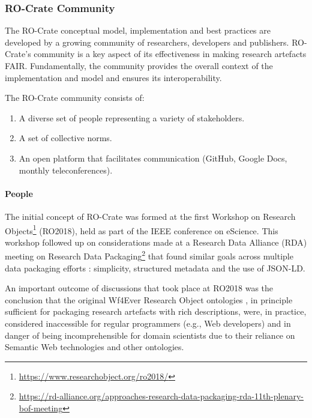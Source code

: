 \subsubsection{RO-Crate Community}\label{ch5:community}

The RO-Crate conceptual model, implementation and best practices are
developed by a growing community of researchers, developers and
publishers. RO-Crate's community is a key aspect of its effectiveness in
making research artefacts FAIR. Fundamentally, the community provides
the overall context of the implementation and model and ensures its
interoperability.

The RO-Crate community consists of:

\begin{enumerate}
\item
  A diverse set of people representing a variety of stakeholders.
\item
  A set of collective norms.
\item
  An open platform that facilitates communication (GitHub, Google Docs,
  monthly teleconferences).
\end{enumerate}

\hypertarget{people}{%
\paragraph{People}\label{ch5:people}}

The initial concept of RO-Crate was formed at the first Workshop on
Research Objects\footnote{\url{https://www.researchobject.org/ro2018/}} (RO2018),
held as part of the IEEE conference on eScience. This workshop followed
up on considerations made at a Research Data Alliance (RDA) meeting on
Research Data
Packaging\footnote{\url{https://rd-alliance.org/approaches-research-data-packaging-rda-11th-plenary-bof-meeting}}
that found similar goals across multiple data packaging efforts
\cite{Ó Carragáin 2019a}: simplicity, structured metadata and the
use of JSON-LD.

An important outcome of discussions that took place at RO2018 was the
conclusion that the original Wf4Ever Research Object ontologies
\cite{Belhajjame 2015}, in
principle sufficient for packaging research artefacts with rich
descriptions, were, in practice, considered inaccessible for regular
programmers (e.g., Web developers) and in danger of being
incomprehensible for domain scientists due to their reliance on Semantic
Web technologies and other ontologies.

